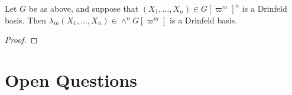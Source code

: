 \documentclass[../main.tex]{subfiles}
\begin{document}
\begin{prop}
    Let $G$ be as above, and suppose that $(X_1, \dots, X_n) \in G[\varpi^m]^n$
    is a Drinfeld basis. Then $\lambda_m(X_1, \dots, X_n) \in \wedge^nG[\varpi^m]$ 
    is a Drinfeld basis.
\begin{proof}

\end{proof}
\end{prop}



\color{darkgray}
\section*{Open Questions}

\color{black}

\end{document}
